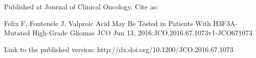 Published at Journal of Clinical Oncology. Cite as:

Felix F, Fontenele J. Valproic Acid May Be Tested in Patients With H3F3A-Mutated High-Grade Gliomas
JCO Jun 13, 2016:JCO.2016.67.1073v1-JCO671073

Link to the published version: http://dx.doi.org/10.1200/JCO.2016.67.1073